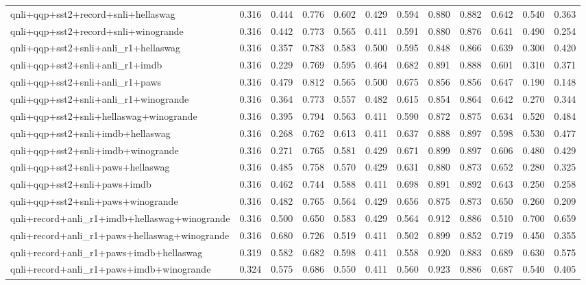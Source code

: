 \begin{table}[t]
\begin{tabular}{lrrrrrrrrrrr}
    qnli+qqp+sst2+record+snli+hellaswag & 0.316 & 0.444 & 0.776 & 0.602 & 0.429 & 0.594 & 0.880 & 0.882 & 0.642 & 0.540 & 0.363 \\
    qnli+qqp+sst2+record+snli+winogrande & 0.316 & 0.442 & 0.773 & 0.565 & 0.411 & 0.591 & 0.880 & 0.876 & 0.641 & 0.490 & 0.254 \\
    qnli+qqp+sst2+snli+anli\_r1+hellaswag & 0.316 & 0.357 & 0.783 & 0.583 & 0.500 & 0.595 & 0.848 & 0.866 & 0.639 & 0.300 & 0.420 \\
    qnli+qqp+sst2+snli+anli\_r1+imdb & 0.316 & 0.229 & 0.769 & 0.595 & 0.464 & 0.682 & 0.891 & 0.888 & 0.601 & 0.310 & 0.371 \\
    qnli+qqp+sst2+snli+anli\_r1+paws & 0.316 & 0.479 & 0.812 & 0.565 & 0.500 & 0.675 & 0.856 & 0.856 & 0.647 & 0.190 & 0.148 \\
    qnli+qqp+sst2+snli+anli\_r1+winogrande & 0.316 & 0.364 & 0.773 & 0.557 & 0.482 & 0.615 & 0.854 & 0.864 & 0.642 & 0.270 & 0.344 \\
    qnli+qqp+sst2+snli+hellaswag+winogrande & 0.316 & 0.395 & 0.794 & 0.563 & 0.411 & 0.590 & 0.872 & 0.875 & 0.634 & 0.520 & 0.484 \\
    qnli+qqp+sst2+snli+imdb+hellaswag & 0.316 & 0.268 & 0.762 & 0.613 & 0.411 & 0.637 & 0.888 & 0.897 & 0.598 & 0.530 & 0.477 \\
    qnli+qqp+sst2+snli+imdb+winogrande & 0.316 & 0.271 & 0.765 & 0.581 & 0.429 & 0.671 & 0.899 & 0.897 & 0.606 & 0.480 & 0.429 \\
    qnli+qqp+sst2+snli+paws+hellaswag & 0.316 & 0.485 & 0.758 & 0.570 & 0.429 & 0.631 & 0.880 & 0.873 & 0.652 & 0.280 & 0.325 \\
    qnli+qqp+sst2+snli+paws+imdb & 0.316 & 0.462 & 0.744 & 0.588 & 0.411 & 0.698 & 0.891 & 0.892 & 0.643 & 0.250 & 0.258 \\
    qnli+qqp+sst2+snli+paws+winogrande & 0.316 & 0.482 & 0.765 & 0.564 & 0.429 & 0.656 & 0.875 & 0.873 & 0.650 & 0.260 & 0.209 \\
    qnli+record+anli\_r1+imdb+hellaswag+winogrande & 0.316 & 0.500 & 0.650 & 0.583 & 0.429 & 0.564 & 0.912 & 0.886 & 0.510 & 0.700 & 0.659 \\
    qnli+record+anli\_r1+paws+hellaswag+winogrande & 0.316 & 0.680 & 0.726 & 0.519 & 0.411 & 0.502 & 0.899 & 0.852 & 0.719 & 0.450 & 0.355 \\
    qnli+record+anli\_r1+paws+imdb+hellaswag & 0.319 & 0.582 & 0.682 & 0.598 & 0.411 & 0.558 & 0.920 & 0.883 & 0.689 & 0.630 & 0.575 \\
    qnli+record+anli\_r1+paws+imdb+winogrande & 0.324 & 0.575 & 0.686 & 0.550 & 0.411 & 0.560 & 0.923 & 0.886 & 0.687 & 0.540 & 0.405 \\

\end{tabular}
\end{table}
